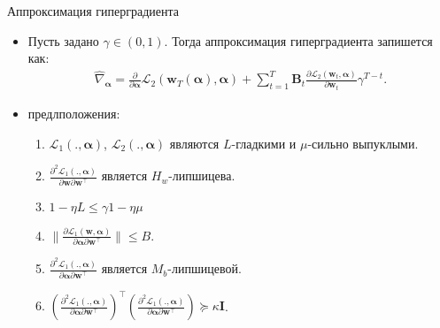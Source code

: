 \documentclass[aspectratio=169]{beamer}
\begin{document}
\begin{frame}{Аппроксимация гиперградиента}
  \begin{itemize}
    \item Пусть задано $\gamma \in (0, 1)$. Тогда аппроксимация гиперградиента запишется как:
  \begin{align*}
    \hat{\nabla}_{\boldsymbol{\alpha}} = \frac{\partial}{\partial \boldsymbol{\alpha}}\mathcal{L}_2(\mathbf{w}_T(\boldsymbol{\alpha}), \boldsymbol{\alpha}) +
    \sum_{t=1}^T \mathbf{B}_t\frac{\partial\mathcal{L}_2(\mathbf{w}_t, \boldsymbol{\alpha})}{\partial \mathbf{w}_t}\gamma^{T-t}.
  \end{align*}
  \item предлположения:
  \begin{enumerate}
    \item $\mathcal{L}_1(., \boldsymbol{\alpha})$, $\mathcal{L}_2(., \boldsymbol{\alpha})$ являются $L$-гладкими 
    и $\mu$-сильно выпуклыми.
    \item $\frac{\partial^2\mathcal{L}_1(., \boldsymbol{\alpha})}{\partial\mathbf{w}\partial\mathbf{w}^\top}$ является $H_w$-липшицева.
    \item $1 - \eta L \leq \gamma 1 - \eta\mu$
    \item $\|\frac{\partial\mathcal{L}_1(\mathbf{w}, \boldsymbol{\alpha})}{\partial\boldsymbol{\alpha}\partial\mathbf{w}^\top}\| \leq B$.
    \item $\frac{\partial^2\mathcal{L}_1(., \boldsymbol{\alpha})}{\partial\boldsymbol{\alpha}\partial\mathbf{w}^\top}$ является $M_b$-липшицевой.
    \item $(\frac{\partial^2\mathcal{L}_1(., \boldsymbol{\alpha})}{\partial\boldsymbol{\alpha}\partial\mathbf{w}^\top})^\top
    (\frac{\partial^2\mathcal{L}_1(., \boldsymbol{\alpha})}{\partial\boldsymbol{\alpha}\partial\mathbf{w}^\top}) \succeq \kappa \mathbf{I}$.
  \end{enumerate}
  \end{itemize}
\end{frame}
\end{document}
